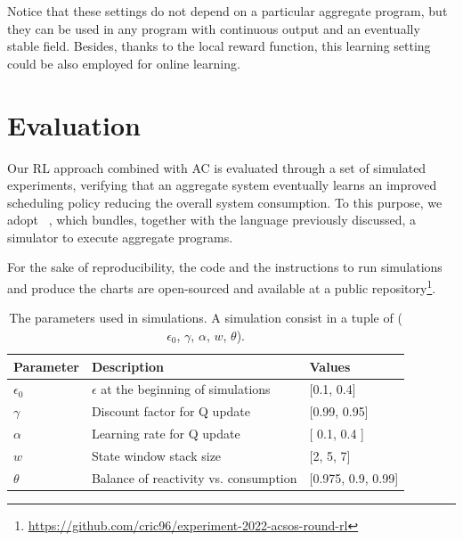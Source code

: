 Notice that these settings do not depend on a particular aggregate program, 
 but they can be used in any program with continuous output and an eventually stable field. 
%
Besides, thanks to the local reward function, 
 this learning setting could be also employed for online learning.

\newcommand{\rlsol}{{\sc{}Rl}}
\newcommand{\periodicsol}{{\sc{}Periodic}}
\newcommand{\adhocsol}{{\sc{}Ad-hoc}}
\newcommand{\swapscen}{{\sc{}Swap}}
\newcommand{\multiswap}{{\sc{}MultiSwap}}
\section{Evaluation}\label{acsos2022:sec:evaluation}


Our \ac{RL} approach combined with \ac{AC} is evaluated through a set of simulated experiments, 
 verifying that an aggregate system eventually learns an improved scheduling policy reducing the overall system consumption.
%
To this purpose, we adopt \scafi{}~\cite{DBLP:conf/isola/CasadeiVAD20}, 
 which bundles, together with the language previously discussed, a simulator to execute aggregate programs.

%
For the sake of reproducibility, the code and the instructions to run simulations and produce the charts are open-sourced and available at a public repository\footnote{\url{https://github.com/cric96/experiment-2022-acsos-round-rl}}.
\begin{table}[t]
    \centering
    \begin{tabular}{|l|l|l|}
    \hline
    Parameter & Description & Values                 \\ \hline
    $\epsilon_0$ & $\epsilon$ at the beginning of simulations & {[}0.1, 0.4{]}        \\ \hline
    $\gamma$  & Discount factor for Q update & {[}0.99, 0.95{]}   \\ \hline
    $\alpha$ & Learning rate for Q update & {[} 0.1, 0.4 {]}                    \\ \hline
    $w$     & State window stack size  & {[}2, 5, 7{]}          \\ \hline
    $\theta$ & Balance of reactivity vs. consumption & {[}0.975, 0.9, 0.99{]} \\ \hline
    \end{tabular}
    \caption{The parameters used in simulations. A simulation consist in a tuple of ($\epsilon_0$, $\gamma$, $\alpha$, $w$, $\theta$).}
    \label{acsos2022:tab:parameters}
\end{table}
